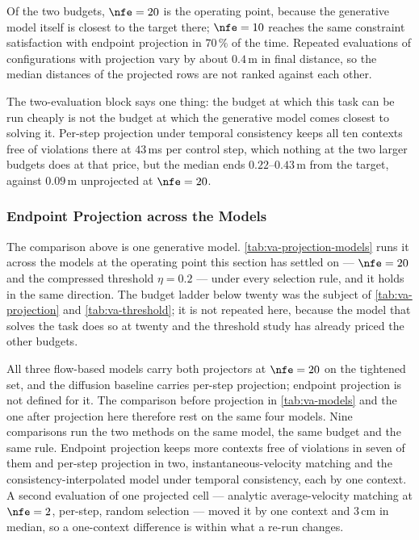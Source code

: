 Of the two budgets, $\nfe=20$ is the operating point, because the generative model itself is closest to
the target there; $\nfe=10$ reaches the same constraint satisfaction with endpoint projection in
$70\,\%$ of the time.
Repeated evaluations of configurations with projection vary by about $0.4$\,m in final
distance, so the median distances of the projected rows are not ranked against each other.

The two-evaluation block says one thing: the budget at which this task can be run cheaply is not the
budget at which the generative model comes closest to solving it. Per-step projection under temporal consistency keeps all
ten contexts free of violations there at $43$\,ms per control step, which nothing at the two larger
budgets does at that price, but the median ends $0.22$--$0.43$\,m from the target, against $0.09$\,m
unprojected at $\nfe=20$.

\subsubsection{Endpoint Projection across the Models}\label{sec:res:aligning:projection:models}

The comparison above is one generative model. \autoref{tab:va-projection-models} runs it across the
models at the operating point this section has settled on --- $\nfe=20$ and the compressed threshold
$\eta=0.2$ --- under every selection rule, and it holds in the same direction. The budget ladder below
twenty was the subject of \autoref{tab:va-projection} and \autoref{tab:va-threshold}; it is not repeated
here, because the model that solves the task does so at twenty and the threshold study has already priced
the other budgets.

All three flow-based models carry both projectors at $\nfe=20$ on the tightened set, and the diffusion
baseline carries per-step projection; endpoint projection is not defined for it. The comparison before
projection in \autoref{tab:va-models} and the one after projection here therefore rest on the same four
models.
Nine comparisons run the two methods on the same model, the same budget and the same rule. Endpoint
projection keeps more contexts free of violations in seven of them and per-step projection in two,
instantaneous-velocity matching and the consistency-interpolated model under temporal consistency, each by
one context. A second evaluation of one projected cell --- analytic average-velocity matching at
$\nfe=2$, per-step, random selection --- moved it by one context and $3$\,cm in median, so a one-context
difference is within what a re-run changes.


